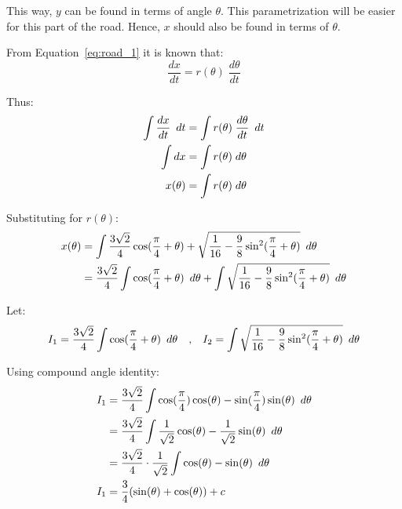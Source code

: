 \documentclass[12pt]{article}
\newcommand{\Hquad}{\hspace{0.5em}}
\begin{document}
        This way, $y$ can be found in terms of angle $\theta$. This parametrization will be easier for this part of the road. Hence, $x$ should also be found in terms of $\theta$.

        From Equation~\ref{eq:road_1} it is known that:
        \begin{equation}
            \frac{dx}{dt} = r(\theta) \;\frac{d\theta}{dt}
        \end{equation}

        Thus:
        \begin{align}
            \int \frac{dx}{dt} \Hquad dt &= \int r(\theta) \;\frac{d\theta}{dt} \Hquad dt \\
            \int dx &= \int r(\theta) \;d\theta \\
            x(\theta) &= \int r(\theta) \;d\theta
        \end{align}

        Substituting for $r(\theta)$:
        \begin{align}
            x(\theta) &= \int \frac{3\sqrt{2}}{4} \cos (\frac{\pi}{4} + \theta) + \sqrt{\frac{1}{16} - \frac{9}{8} \sin^2 (\frac{\pi}{4}+\theta)} \Hquad d\theta \\
            &= \frac{3\sqrt{2}}{4} \int \cos (\frac{\pi}{4} + \theta) \Hquad d\theta + \int \sqrt{\frac{1}{16} - \frac{9}{8} \sin^2 (\frac{\pi}{4}+\theta)} \Hquad d\theta
        \end{align}

        Let:
        \begin{align}
            I_1 = \frac{3\sqrt{2}}{4} \int \cos (\frac{\pi}{4} + \theta) \Hquad d\theta \quad \text{,} \quad
            I_2 = \int \sqrt{\frac{1}{16} - \frac{9}{8} \sin^2 (\frac{\pi}{4}+\theta)} \Hquad d\theta
        \end{align}

        Using compound angle identity:
        \begin{align}
            I_1 &= \frac{3\sqrt{2}}{4} \int \cos (\frac{\pi}{4}) \cos(\theta) - \sin(\frac{\pi}{4}) \sin(\theta) \Hquad d\theta \\
            &= \frac{3\sqrt{2}}{4} \int \frac{1}{\sqrt{2}} \cos(\theta) - \frac{1}{\sqrt{2}} \sin(\theta) \Hquad d\theta \\
            &= \frac{3\sqrt{2}}{4} \cdot \frac{1}{\sqrt{2}} \int \cos(\theta) - \sin(\theta) \Hquad d\theta \\
            I_1 &= \frac{3}{4} (\sin(\theta) + \cos(\theta)) + c
        \end{align}
\end{document}
